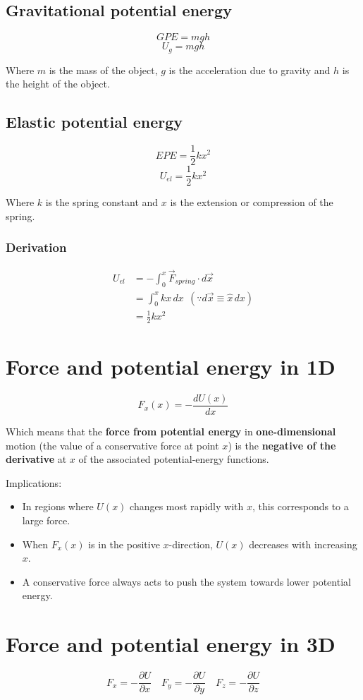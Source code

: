 \documentclass[11pt]{article}
\begin{document}
\subsection{Gravitational potential energy}
\label{sec:org8571df4}
\[GPE = mgh\]
\[U_{g} = mgh\]

Where \(m\) is the mass of the object, \(g\) is the acceleration due to gravity and \(h\) is the height of the object.
\subsection{Elastic potential energy}
\label{sec:org1f28b17}
\[EPE = \frac{1}{2}kx^2\]
\[U_{el} = \frac{1}{2}kx^2\]

Where \(k\) is the spring constant and \(x\) is the extension or compression of the spring.
\subsubsection{Derivation}
\label{sec:orga2ac338}
\begin{align*}
U_{el} &= - \int_0^x \vec{F}_{spring} \cdot d \vec{x} \\
&= \int_0^x kx \, dx \ \ (\because d \vec{x} \equiv \hat{x} \, dx ) \\
&= \frac{1}{2}kx^2
\end{align*}
\section{Force and potential energy in 1D}
\label{sec:org41d78fe}
\[F_x(x) = - \frac{dU(x)}{dx}\]

Which means that the \textbf{force from potential energy} in \textbf{one-dimensional} motion (the value of a conservative force at point \(x\)) is the \textbf{negative of the derivative} at \(x\) of the associated potential-energy functions.

Implications:
\begin{itemize}
\item In regions where \(U(x)\) changes most rapidly with \(x\), this corresponds to a large force.
\item When \(F_x(x)\) is in the positive \(x\)-direction, \(U(x)\) decreases with increasing \(x\).
\item A conservative force always acts to push the system towards lower potential energy.
\end{itemize}

\newpage
\section{Force and potential energy in 3D}
\label{sec:orge6e0e94}
\[F_x = -\frac{\partial U}{\partial x} \quad F_y = -\frac{\partial U}{\partial y} \quad F_z = -\frac{\partial U}{\partial z}\]
\end{document}

